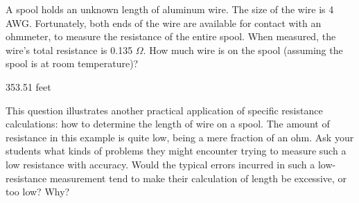 

A spool holds an unknown length of aluminum wire.  The size of the wire is 4 AWG.  Fortunately, both ends of the wire are available for contact with an ohmmeter, to measure the resistance of the entire spool.  When measured, the wire's total resistance is 0.135 $\Omega$.  How much wire is on the spool (assuming the spool is at room temperature)?







353.51 feet







This question illustrates another practical application of specific resistance calculations: how to determine the length of wire on a spool.  The amount of resistance in this example is quite low, being a mere fraction of an ohm.  Ask your students what kinds of problems they might encounter trying to measure such a low resistance with accuracy.  Would the typical errors incurred in such a low-resistance measurement tend to make their calculation of length be excessive, or too low?  Why?




